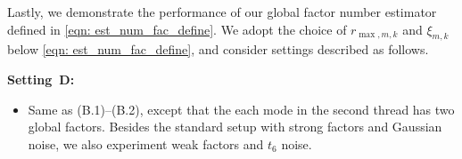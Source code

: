 \documentclass[aos]{imsart}
\theoremstyle{plain}
\theoremstyle{definition}
\begin{document}
Lastly, we demonstrate the performance of our global factor number estimator defined in \eqref{eqn: est_num_fac_define}. We adopt the choice of $r_{\max,m,k}$ and $\xi_{m,k}$ below \eqref{eqn: est_num_fac_define}, and consider settings described as follows.

\vspace{12pt}
\noindent\textbf{Setting~D:}
\begin{itemize}
    \item [(D.1--2)] Same as (B.1)--(B.2), except that the each mode in the second thread has two global factors. Besides the standard setup with strong factors and Gaussian noise, we also experiment weak factors and $t_6$ noise.
\end{itemize}
\vspace{12pt}
\end{document}
